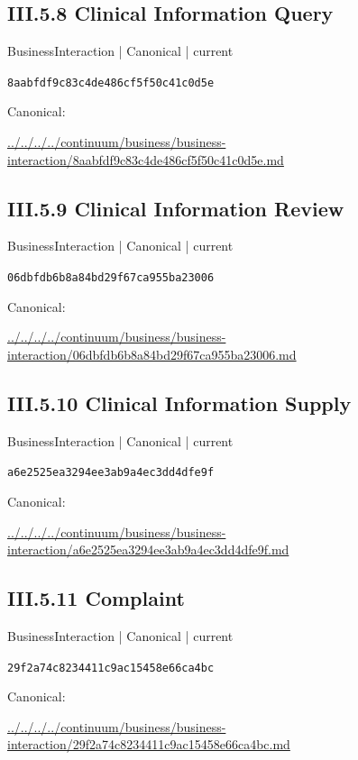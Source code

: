 \documentclass[10pt,a4paper]{article}
\begin{document}
\subsection*{III.5.8 Clinical Information Query}
\label{element-8aabfdf9c83c4de486cf5f50c41c0d5e}
{\small BusinessInteraction | Canonical | current}\par
\texttt{8aabfdf9c83c4de486cf5f50c41c0d5e}\par
Canonical: \par
{\footnotesize\url{../../../../continuum/business/business-interaction/8aabfdf9c83c4de486cf5f50c41c0d5e.md}}\par
\subsection*{III.5.9 Clinical Information Review}
\label{element-06dbfdb6b8a84bd29f67ca955ba23006}
{\small BusinessInteraction | Canonical | current}\par
\texttt{06dbfdb6b8a84bd29f67ca955ba23006}\par
Canonical: \par
{\footnotesize\url{../../../../continuum/business/business-interaction/06dbfdb6b8a84bd29f67ca955ba23006.md}}\par
\subsection*{III.5.10 Clinical Information Supply}
\label{element-a6e2525ea3294ee3ab9a4ec3dd4dfe9f}
{\small BusinessInteraction | Canonical | current}\par
\texttt{a6e2525ea3294ee3ab9a4ec3dd4dfe9f}\par
Canonical: \par
{\footnotesize\url{../../../../continuum/business/business-interaction/a6e2525ea3294ee3ab9a4ec3dd4dfe9f.md}}\par
\subsection*{III.5.11 Complaint}
\label{element-29f2a74c8234411c9ac15458e66ca4bc}
{\small BusinessInteraction | Canonical | current}\par
\texttt{29f2a74c8234411c9ac15458e66ca4bc}\par
Canonical: \par
{\footnotesize\url{../../../../continuum/business/business-interaction/29f2a74c8234411c9ac15458e66ca4bc.md}}\par
\end{document}
